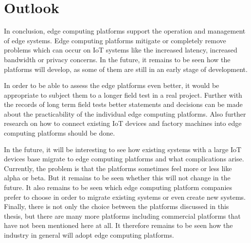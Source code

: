 \chapter{Outlook}
In conclusion, edge computing platforms support the operation and management of edge systems. Edge computing platforms mitigate or completely remove problems which can occur on IoT systems like the increased latency, increased bandwidth or privacy concerns. In the future, it remains to be seen how the platforms will develop, as some of them are still in an early stage of development.

\bigskip
In order to be able to assess the edge platforms even better, it would be appropriate to subject them to a longer field test in a real project. Further with the records of long term field tests better statements and decisions can be made about the practicability of the individual edge computing platforms. Also further research on how to connect existing IoT devices and factory machines into edge computing platforms should be done.

\bigskip
In the future, it will be interesting to see how existing systems with a large IoT devices base migrate to edge computing platforms and what complications arise. Currently, the problem is that the platforms sometimes feel more or less like alpha or beta. But it remains to be seen whether this will not change in the future. It also remains to be seen which edge computing platform companies prefer to choose in order to migrate existing systems or even create new systems. Finally, there is not only the choice between the platforms discussed in this thesis, but there are many more platforms including commercial platforms that have not been mentioned here at all. It therefore remains to be seen how the industry in general will adopt edge computing platforms.
